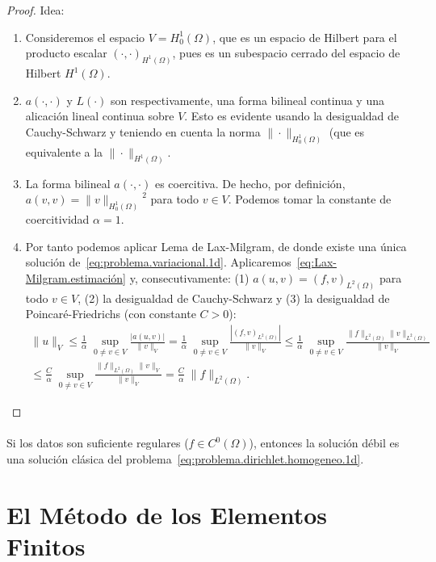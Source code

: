\documentclass[11pt]{article}
\theoremstyle{plain}
\theoremstyle{definition}
\newcounter{stepnum}[section]
\newcommand{\step}[1][]{\bigskip\noindent\textbf{\thesection.\refstepcounter{stepnum}\thestepnum}.\enspace{#1}}
\renewcommand{\step}[1][]{\paragraph{#1}\hspace{-1.1em}}
\newcommand{\norm}[2][]{\ensuremath{\|#2\|_{#1}}}
\begin{document}
{\begin{proof}
  Idea:
  \begin{enumerate}
    \item Consideremos el espacio $V=H_0^1(\Omega)$, que es un espacio de Hilbert para el producto escalar $(\cdot,\cdot)_{H^1(\Omega)}$, pues es un subespacio cerrado del espacio de Hilbert $H^1(\Omega)$. 
    \item $a(\cdot,\cdot)$ y $L(\cdot)$ son respectivamente, una forma bilineal continua y una alicación lineal continua sobre $V$. Esto es evidente usando la desigualdad de Cauchy-Schwarz y teniendo en cuenta la norma $\norm[H_0^1(\Omega)]{\cdot}$ (que es equivalente a la $\norm[H^1(\Omega)]{\cdot}$.
    \item La forma bilineal $a(\cdot,\cdot)$ es coercitiva. De hecho, por definición, $a(v,v)=\norm[H_0^1(\Omega)]{v}^2$ para todo $v\in V$. Podemos tomar la constante de coercitividad $\alpha=1$.
  \item Por tanto podemos aplicar Lema de Lax-Milgram, de donde existe una única solución de~\eqref{eq:problema.variacional.1d}. Aplicaremos~\eqref{eq:Lax-Milgram.estimación} y, consecutivamente: (1) $a(u,v)=(f,v)_{L^2(\Omega)}$ para todo $v\in V$, (2) la desigualdad de Cauchy-Schwarz y (3) la desigualdad de Poincaré-Friedrichs (con constante $C>0$):
      \begin{align*}
        \norm[V]{u} \le 
        \frac 1 {\alpha}\;\sup_{0\neq v\in V}\frac{|a(u,v)|}{\norm[V]{v}} =
        \frac 1 {\alpha}\;\sup_{0\neq v\in V}\frac{|(f,v)_{L^2(\Omega)}|}{\norm[V]{v}}
        \le
        \frac 1 {\alpha}\;\sup_{0\neq v\in V}\frac{\norm[L^2(\Omega)]{f}\norm[L^2(\Omega)]{v}}{\norm[V]{v}}
        \\
        \le
        \frac C {\alpha}\;\sup_{0\neq v\in V}\frac{\norm[L^2(\Omega)]{f}\norm[V]{v}}{\norm[V]{v}}
        =
        \frac C {\alpha}\;\norm[L^2(\Omega)]{f}.
      \end{align*}
  \end{enumerate}
\end{proof}

\step{\textbf{Proposición}.}
Si los datos son suficiente regulares ($f\in C^0(\Omega)$), entonces la solución débil es una solución clásica del problema~\eqref{eq:problema.dirichlet.homogeneo.1d}.

\section{El Método de los Elementos Finitos}

}
\end{document}
